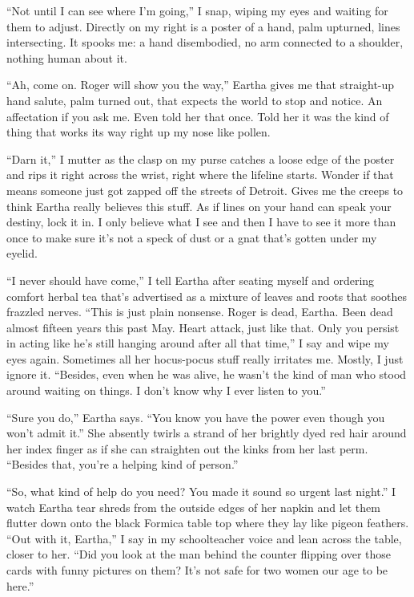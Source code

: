 \documentclass[
]{article}
\begin{document}
``Not until I can see where I'm going,'' I snap, wiping my eyes and
waiting for them to adjust. Directly on my right is a poster of a hand,
palm upturned, lines intersecting. It spooks me: a hand dis­embodied, no
arm connected to a shoulder, nothing human about it.

``Ah, come on. Roger will show you the way,'' Eartha gives me that
straight-up hand salute, palm turned out, that expects the world to stop
and notice. An affectation if you ask me. Even told her that once. Told
her it was the kind of thing that works its way right up my nose like
pollen.

``Darn it,'' I mutter as the clasp on my purse catches a loose edge of
the poster and rips it right across the wrist, right where the lifeline
starts. Wonder if that means someone just got zapped off the streets of
Detroit. Gives me the creeps to think Eartha really believes this stuff.
As if lines on your hand can speak your destiny, lock it in. I only
believe what I see and then I have to see it more than once to make sure
it's not a speck of dust or a gnat that's gotten under my eyelid.

``I never should have come,'' I tell Eartha after seating myself and
ordering comfort herbal tea that's advertised as a mixture of leaves and
roots that soothes frazzled nerves. ``This is just plain non­sense.
Roger is dead, Eartha. Been dead almost fifteen years this past May.
Heart attack, just like that. Only you persist in acting like he's still
hanging around after all that time,'' I say and wipe my eyes again.
Sometimes all her hocus-pocus stuff really irritates me. Mostly, I just
ignore it. ``Besides, even when he was alive, he wasn't the kind of man
who stood around waiting on things. I don't know why I ever listen to
you.''

``Sure you do,'' Eartha says. ``You know you have the power even though
you won't admit it.'' She absently twirls a strand of her brightly dyed
red hair around her index finger as if she can straighten out the kinks
from her last perm. ``Besides that, you're a helping kind of person.''

``So, what kind of help do you need? You made it sound so urgent last
night.'' I watch Eartha tear shreds from the outside edges of her napkin
and let them flutter down onto the black Formica table top where they
lay like pigeon feathers. ``Out with it, Eartha,'' I say in my
schoolteacher voice and lean across the table, closer to her. ``Did you
look at the man behind the counter flipping over those cards with funny
pictures on them? It's not safe for two women our age to be here.''
\end{document}
